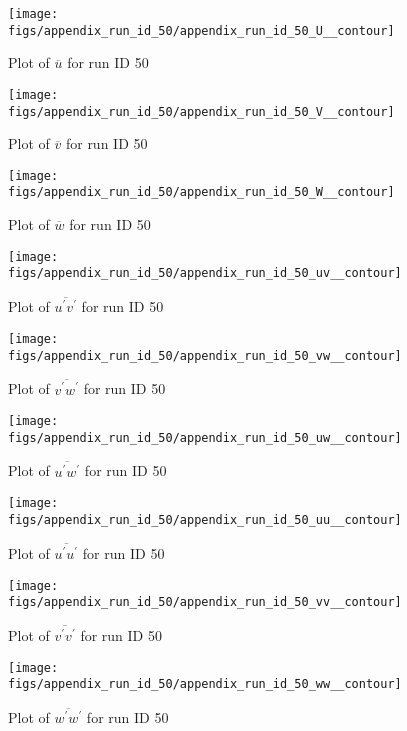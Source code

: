 \begin{figure}[H]
\centering
\texttt{[image: figs/appendix\_run\_id\_50/appendix\_run\_id\_50\_U\_\_contour]}
\caption{Plot of $\overline{u}$ for run ID 50}
\label{fig:appendix_run_id_50_U__contour}
\end{figure}


\begin{figure}[H]
\centering
\texttt{[image: figs/appendix\_run\_id\_50/appendix\_run\_id\_50\_V\_\_contour]}
\caption{Plot of $\overline{v}$ for run ID 50}
\label{fig:appendix_run_id_50_V__contour}
\end{figure}


\begin{figure}[H]
\centering
\texttt{[image: figs/appendix\_run\_id\_50/appendix\_run\_id\_50\_W\_\_contour]}
\caption{Plot of $\overline{w}$ for run ID 50}
\label{fig:appendix_run_id_50_W__contour}
\end{figure}


\begin{figure}[H]
\centering
\texttt{[image: figs/appendix\_run\_id\_50/appendix\_run\_id\_50\_uv\_\_contour]}
\caption{Plot of $\overline{u^\prime v^\prime}$ for run ID 50}
\label{fig:appendix_run_id_50_uv__contour}
\end{figure}


\begin{figure}[H]
\centering
\texttt{[image: figs/appendix\_run\_id\_50/appendix\_run\_id\_50\_vw\_\_contour]}
\caption{Plot of $\overline{v^\prime w^\prime}$ for run ID 50}
\label{fig:appendix_run_id_50_vw__contour}
\end{figure}


\begin{figure}[H]
\centering
\texttt{[image: figs/appendix\_run\_id\_50/appendix\_run\_id\_50\_uw\_\_contour]}
\caption{Plot of $\overline{u^\prime w^\prime}$ for run ID 50}
\label{fig:appendix_run_id_50_uw__contour}
\end{figure}


\begin{figure}[H]
\centering
\texttt{[image: figs/appendix\_run\_id\_50/appendix\_run\_id\_50\_uu\_\_contour]}
\caption{Plot of $\overline{u^\prime u^\prime}$ for run ID 50}
\label{fig:appendix_run_id_50_uu__contour}
\end{figure}


\begin{figure}[H]
\centering
\texttt{[image: figs/appendix\_run\_id\_50/appendix\_run\_id\_50\_vv\_\_contour]}
\caption{Plot of $\overline{v^\prime v^\prime}$ for run ID 50}
\label{fig:appendix_run_id_50_vv__contour}
\end{figure}


\begin{figure}[H]
\centering
\texttt{[image: figs/appendix\_run\_id\_50/appendix\_run\_id\_50\_ww\_\_contour]}
\caption{Plot of $\overline{w^\prime w^\prime}$ for run ID 50}
\label{fig:appendix_run_id_50_ww__contour}
\end{figure}


